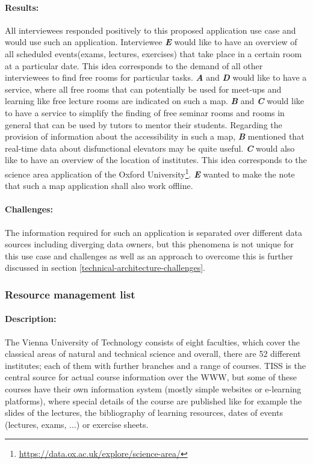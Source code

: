 \documentclass{article}
\begin{document}
\paragraph{Results:}
All interviewees responded positively to this proposed application use case and would use such an application. Interviewee \textit{\textbf{E}} would like to have an overview of all scheduled events(exams, lectures, exercises) that take place in a certain room at a particular date. This idea corresponds to the demand of all other interviewees to find free rooms for particular tasks. \textit{\textbf{A}} and \textit{\textbf{D}} would like to have a service, where all free rooms that can potentially be used for meet-ups and learning like free lecture rooms are indicated on such a map. \textit{\textbf{B}} and \textit{\textbf{C}} would like to have a service to simplify the finding of free seminar rooms and rooms in general that can be used by tutors to mentor their students. Regarding the provision of information about the accessibility in such a map, \textit{\textbf{B}} mentioned that real-time data about disfunctional elevators may be quite useful. \textit{\textbf{C}} would also like to have an overview of the location of institutes. This idea corresponds to the science area application of the Oxford University\footnote{\url{https://data.ox.ac.uk/explore/science-area/}}. \textit{\textbf{E}} wanted to make the note that such a map application shall also work offline.

\paragraph{Challenges:}
The information required for such an application is separated over different data sources including diverging data owners, but this phenomena is not unique for this use case and challenges as well as an approach to overcome this is further discussed in section \ref{technical-architecture-challenges}.

\subsubsection{Resource management list}
\label{lod-benefits-challenges:explored-needs-usecases:rlm}

\paragraph{Description:}
The Vienna University of Technology consists of eight faculties, which cover the classical areas of natural and technical science and overall, there are 52 different institutes; each of them with further branches and a range of courses. TISS is the central source for actual course information over the WWW, but some of these courses have their own information system (mostly simple websites or e-learning platforms), where special details of the course are published like for example the slides of the lectures, the bibliography of learning resources, dates of events (lectures, exams, ...) or exercise sheets.
\end{document}
